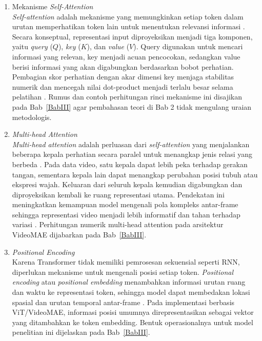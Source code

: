 \begin{enumerate}
	\item Mekanisme \textit{Self-Attention}\\
	\textit{Self-attention} adalah mekanisme yang memungkinkan setiap token dalam urutan memperhatikan token lain untuk menentukan relevansi informasi \cite{Vaswani2023}. Secara konseptual, representasi input diproyeksikan menjadi tiga komponen, yaitu \textit{query} ($Q$), \textit{key} ($K$), dan \textit{value} ($V$). Query digunakan untuk mencari informasi yang relevan, key menjadi acuan pencocokan, sedangkan value berisi informasi yang akan digabungkan berdasarkan bobot perhatian. Pembagian skor perhatian dengan akar dimensi key menjaga stabilitas numerik dan mencegah nilai dot-product menjadi terlalu besar selama pelatihan \cite{IGoodfellow2016}. Rumus dan contoh perhitungan rinci mekanisme ini disajikan pada Bab~\ref{BabIII} agar pembahasan teori di Bab 2 tidak mengulang uraian metodologis.\par

	\item \textit{Multi-head Attention}\\
	\textit{Multi-head attention} adalah perluasan dari \textit{self-attention} yang menjalankan beberapa kepala perhatian secara paralel untuk menangkap jenis relasi yang berbeda \cite{Vaswani2023}. Pada data video, satu kepala dapat lebih peka terhadap gerakan tangan, sementara kepala lain dapat menangkap perubahan posisi tubuh atau ekspresi wajah. Keluaran dari seluruh kepala kemudian digabungkan dan diproyeksikan kembali ke ruang representasi utama. Pendekatan ini meningkatkan kemampuan model mengenali pola kompleks antar-frame sehingga representasi video menjadi lebih informatif dan tahan terhadap variasi \cite{Arnab2021}. Perhitungan numerik multi-head attention pada arsitektur VideoMAE dijabarkan pada Bab~\ref{BabIII}.\par

	\item \textit{Positional Encoding}\\
	Karena Transformer tidak memiliki pemrosesan sekuensial seperti RNN, diperlukan mekanisme untuk mengenali posisi setiap token. \textit{Positional encoding} atau \textit{positional embedding} menambahkan informasi urutan ruang dan waktu ke representasi token, sehingga model dapat membedakan lokasi spasial dan urutan temporal antar-frame \cite{Vaswani2023}. Pada implementasi berbasis ViT/VideoMAE, informasi posisi umumnya direpresentasikan sebagai vektor yang ditambahkan ke token embedding. Bentuk operasionalnya untuk model penelitian ini dijelaskan pada Bab~\ref{BabIII}.\par



\end{enumerate}
